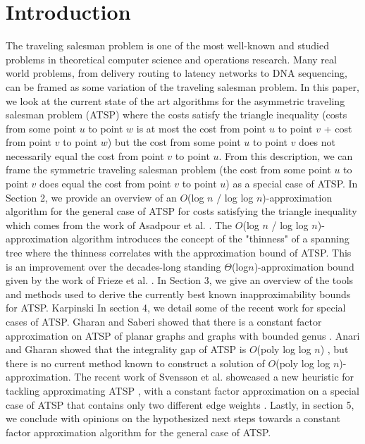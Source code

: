 \documentclass[oneside]{projectpaper} %
\begin{document}
\section{Introduction}
The traveling salesman problem is one of the most well-known and studied problems in theoretical computer science and operations research. Many real world problems, from delivery routing to latency networks to DNA sequencing, can be framed as some variation of the traveling salesman problem. In this paper, we look at the current state of the art algorithms for the asymmetric traveling salesman problem (ATSP) where the costs satisfy the triangle inequality (costs from some point $u$ to point $w$ is at most the cost from point $u$ to point $v$ + cost from point $v$ to point $w$) but the cost from some point $u$ to point $v$ does not necessarily equal the cost from point $v$ to point $u$. From this description, we can frame the symmetric traveling salesman problem (the cost from some point $u$ to point $v$ does equal the cost from point $v$ to point $u$) as a special case of ATSP. \newline
\indent In Section 2, we provide an overview of an $O$(log $n$ / log log $n$)-approximation algorithm for the general case of ATSP for costs satisfying the triangle inequality which comes from the work of Asadpour et al. \cite{AGM10}. The $O$(log $n$ / log log $n$)-approximation algorithm introduces the concept of the "thinness" of a spanning tree where the thinness correlates with the approximation bound of ATSP. This is an improvement over the decades-long standing $\Theta$(log$n$)-approximation bound given by the work of Frieze et al. \cite{FGM83}. \newline
\indent In Section 3, we give an overview of the tools and methods used to derive the currently best known inapproximability bounds for ATSP. Karpinski \newline
\indent In section 4, we detail some of the recent work for special cases of ATSP.  Gharan and Saberi showed that there is a constant factor approximation on ATSP of planar graphs and graphs with bounded genus \cite{GS11}. Anari and Gharan showed that the integrality gap of ATSP is $O$(poly log log $n$) \cite{AG15}, but there is no current method known to construct a solution of $O$(poly log log $n$)-approximation. The recent work of Svensson et al. showcased a new heuristic for tackling approximating ATSP \cite{Sve15}, with a constant factor approximation on a special case of ATSP that contains only two different edge weights \cite{STV16}. \newline
\indent Lastly, in section 5, we conclude with opinions on the hypothesized next steps towards a constant factor approximation algorithm for the general case of ATSP.
\end{document}
